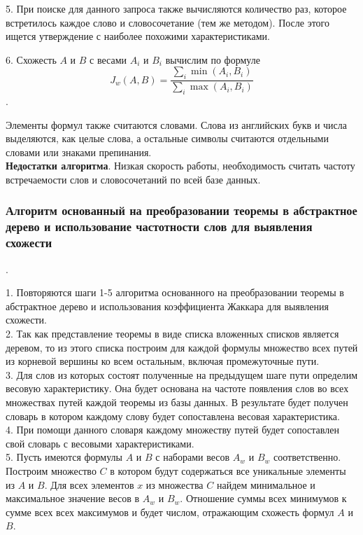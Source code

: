 \documentclass[12pt]{article}
\begin{document}
5. При поиске для данного запроса также вычисляются количество раз, которое встретилось каждое слово и словосочетание (тем же методом). После этого ищется утверждение с наиболее похожими характеристиками.

6. Схожесть $A$ и $B$ с весами $A_i$ и $B_i$ вычислим по формуле   $$J_w(A,B)=\dfrac{\sum_{i} \min(A_i,B_i)}{\sum _{i} \max(A_i,B_i)}$$. 

Элементы формул также считаются словами.  Слова из английских букв и числа выделяются, как целые слова, а остальные символы считаются отдельными словами или знаками препинания.\\

\textbf{Недостатки алгоритма}. Низкая скорость работы, необходимость считать частоту встречаемости слов и словосочетаний по всей базе данных. 

\subsubsection{Алгоритм основанный на преобразовании теоремы в абстрактное дерево и использование частотности слов для выявления схожести}.  

1. Повторяются шаги 1-5 алгоритма основанного на преобразовании теоремы в абстрактное дерево и использования коэффициента Жаккара для выявления схожести. \\

2. Так как представление теоремы в виде списка вложенных списков является деревом, то из этого списка построим для каждой формулы множество всех путей из корневой вершины ко всем остальным, включая промежуточные пути. \\

3. Для слов из которых состоят полученные на предыдущем шаге пути определим весовую характеристику. Она будет основана на частоте появления слов во всех множествах путей каждой теоремы из базы данных. В результате будет получен словарь в котором каждому слову будет сопоставлена весовая характеристика. \\

4. При помощи данного словаря каждому множеству путей будет сопоставлен свой словарь с весовыми характеристиками. \\

5. Пусть имеются формулы $A$ и $B$ с наборами весов $A_w$ и $B_w$ соответственно. Построим множество $C$ в котором будут содержаться все уникальные элементы из $A$ и $B$. Для всех элементов $x$ из множества $C$ найдем минимальное и максимальное значение весов в $A_w$ и $B_w$.  Отношение суммы всех минимумов к сумме всех всех максимумов и будет числом, отражающим схожесть формул $A$ и $B$.\\
\end{document}

